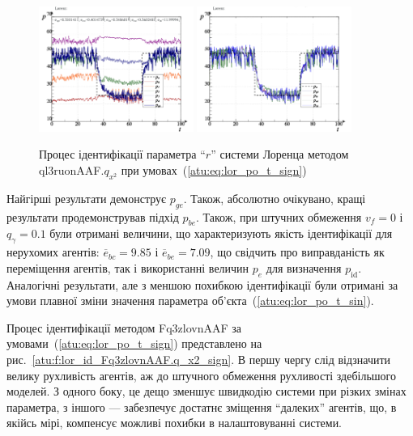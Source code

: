 \documentclass[a4paper,13pt]{atuaref}
\begin{document}
\begin{figure}[ht!]
  \centerline{
    \includegraphics[width=0.45\textwidth]{p5/p/cha/lor/ql3ruonAAF/lor_ql3ruonAAF_qy2-p_t_pi_sign_xl.png}
    \hfill
    \includegraphics[width=0.45\textwidth]{p5/p/cha/lor/ql3ruonAAF/lor_ql3ruonAAF_qy2-p_t_pz_sign_xl.png}
  }
  \caption{Процес ідентифікації параметра ``$r$'' системи Лоренца методом ql3ruonAAF.$q_{x^2}$ при умовах~(\ref{atu:eq:lor_po_t_sign})}
  \label{atu:f:lor_id_ql3ruonAAF.q_x2_sign}
\end{figure}

Найгірші результати демонструє $ p_{ge} $. Також, абсолютно очікувано, кращі
результати продемонстрував підхід $ p_{be}$. Також, при штучних обмеження
$v_f = 0 $ і $ q_\gamma = 0.1 $ були отримані величини, що характеризують
якість ідентифікації для нерухомих агентів:
$ \overline{e}_{bc} = 9.85 $ і
$ \overline{e}_{be} = 7.09 $, що свідчить про виправданість як переміщення
агентів, так і використанні величин $ p_e $ для визначення $ p_\mathrm{id} $.
Аналогічні результати, але з меншою похибкою ідентифікації були отримані за
умови плавної зміни значення параметра об'єкта~(\ref{atu:eq:lor_po_t_sin}).

Процес ідентифікації методом Fq3zlovnAAF за умовами~(\ref{atu:eq:lor_po_t_sign}) представлено
на рис.~\ref{atu:f:lor_id_Fq3zlovnAAF.q_x2_sign}. В першу чергу слід
відзначити велику рухливість агентів, аж до штучного обмеження рухливості
здебільшого моделей. З одного боку, це дещо зменшує швидкодію системи при
різких змінах параметра, з іншого --- забезпечує достатнє зміщення ``далеких''
агентів, що, в якійсь мірі, компенсує можливі похибки в налаштовуванні системи.
\end{document}
